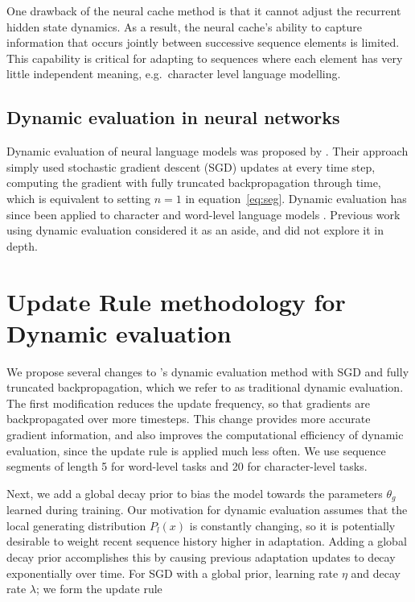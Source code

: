 \documentclass{article}
\begin{document}
One drawback of the neural cache method is that it cannot adjust the recurrent hidden state dynamics. As a result, the neural cache's ability to capture information that occurs jointly between successive sequence elements is limited. This capability is critical for adapting to sequences where each element has very little independent meaning, e.g.\ character level language modelling. 

\subsection{Dynamic evaluation in neural networks}

Dynamic evaluation of neural language models was proposed by \citet{mikolov2010}. Their approach simply used stochastic gradient descent (SGD) updates at every time step, computing the gradient with fully truncated backpropagation through time, which is equivalent to setting $n\!=\!1$ in equation~\eqref{eq:seg}. Dynamic evaluation has since been applied to character and word-level language models \citep{Graves-2013,krause2017,ororbia2017,fortunato2017}. Previous work using dynamic evaluation considered it as an aside, and did not explore it in depth.

\section{Update Rule methodology for Dynamic evaluation}
\label{sec:updaterule}

We propose several changes to \citet{mikolov2010}'s dynamic evaluation method with SGD and fully truncated backpropagation, which we refer to as traditional dynamic evaluation. The first modification reduces the update frequency, so that gradients are backpropagated over more timesteps. This change provides more accurate gradient information, and also improves the computational efficiency of dynamic evaluation, since the update rule is applied much less often. We use sequence segments of length 5 for word-level tasks and 20 for character-level tasks. 

Next, we add a global decay prior to bias the model towards the parameters $\theta_g$ learned during training. Our motivation for dynamic evaluation assumes that the local generating distribution $P_l(x)$ is constantly changing, so it is potentially desirable to weight recent sequence history higher in adaptation. Adding a global decay prior accomplishes this by causing previous adaptation updates to decay exponentially over time. For SGD with a global prior, learning rate $\eta$ and decay rate $\lambda$; we form the update rule
\end{document}
